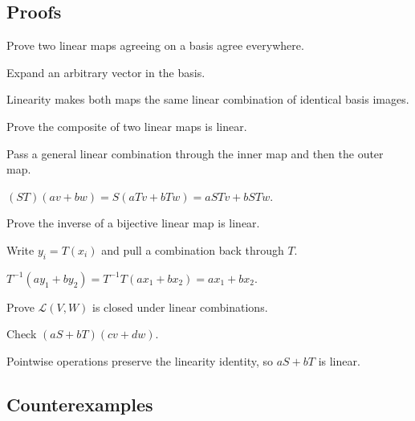 \subsection*{Proofs}

\begin{exercise}\label{exr:i05-expand-06}
Prove two linear maps agreeing on a basis agree everywhere.
\end{exercise}
\begin{hint}
Expand an arbitrary vector in the basis.
\end{hint}
\begin{solution}
Linearity makes both maps the same linear combination of identical basis images.
\end{solution}

\begin{exercise}\label{exr:i05-expand-07}
Prove the composite of two linear maps is linear.
\end{exercise}
\begin{hint}
Pass a general linear combination through the inner map and then the outer map.
\end{hint}
\begin{solution}
\((ST)(av+bw)=S(aTv+bTw)=aSTv+bSTw\).
\end{solution}

\begin{exercise}\label{exr:i05-expand-08}
Prove the inverse of a bijective linear map is linear.
\end{exercise}
\begin{hint}
Write \(y_i=T(x_i)\) and pull a combination back through \(T\).
\end{hint}
\begin{solution}
\(T^{-1}(ay_1+by_2)=T^{-1}T(ax_1+bx_2)=ax_1+bx_2\).
\end{solution}

\begin{exercise}\label{exr:i05-expand-09}
Prove \(\mathcal L(V,W)\) is closed under linear combinations.
\end{exercise}
\begin{hint}
Check \((aS+bT)(cv+dw)\).
\end{hint}
\begin{solution}
Pointwise operations preserve the linearity identity, so \(aS+bT\) is linear.
\end{solution}

\subsection*{Counterexamples}

